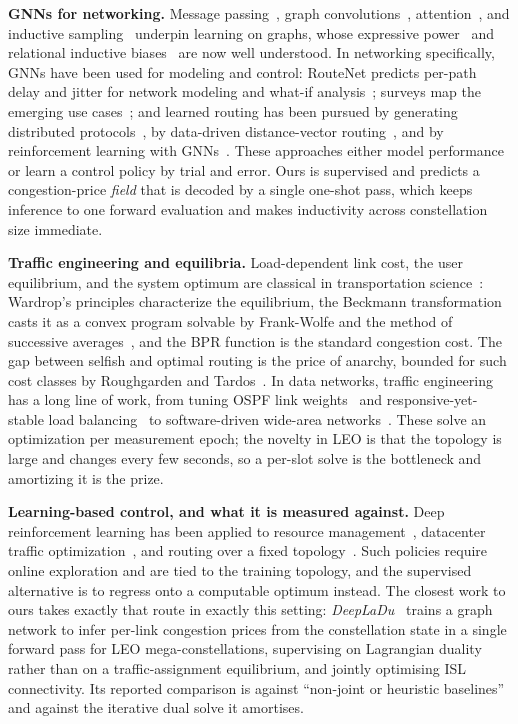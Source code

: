 \documentclass[journal]{IEEEtran}
\begin{document}
\textbf{GNNs for networking.} Message passing~\cite{mpnn}, graph convolutions~\cite{gcn},
attention~\cite{gat}, and inductive sampling~\cite{graphsage} underpin learning on graphs,
whose expressive power~\cite{gin} and relational inductive biases~\cite{battaglia} are now
well understood. In networking specifically, GNNs have been used for modeling and control:
RouteNet predicts per-path delay and jitter for network modeling and what-if
analysis~\cite{routenet}; surveys map the emerging use cases~\cite{suarez}; and learned
routing has been pursued by generating distributed protocols~\cite{geyer}, by data-driven
distance-vector routing~\cite{gddr}, and by reinforcement learning with
GNNs~\cite{almasan}. These approaches either model performance or learn a control policy by
trial and error. Ours is supervised and predicts a congestion-price \emph{field} that is
decoded by a single one-shot pass, which keeps inference to one forward evaluation and
makes inductivity across constellation size immediate.

\textbf{Traffic engineering and equilibria.} Load-dependent link cost, the user
equilibrium, and the system optimum are classical in transportation
science~\cite{wardrop,bpr,beckmann,sheffi}: Wardrop's principles characterize the
equilibrium, the Beckmann transformation casts it as a convex program solvable by
Frank-Wolfe and the method of successive averages~\cite{frankwolfe,sheffi}, and the BPR
function is the standard congestion cost. The gap between selfish and optimal routing is
the price of anarchy, bounded for such cost classes by Roughgarden and Tardos~\cite{poa}.
In data networks, traffic engineering has a long line of work, from tuning OSPF link
weights~\cite{fortz} and responsive-yet-stable load balancing~\cite{texcp} to
software-driven wide-area networks~\cite{swan,b4}. These solve an optimization per
measurement epoch; the novelty in LEO is that the topology is large and changes every few
seconds, so a per-slot solve is the bottleneck and amortizing it is the prize.

\textbf{Learning-based control, and what it is measured against.} Deep reinforcement learning
has been applied to resource management~\cite{deeprm}, datacenter traffic
optimization~\cite{auto}, and routing over a fixed topology~\cite{valadarsky,xu}. Such
policies require online exploration and are tied to the training topology, and the
supervised alternative is to regress onto a computable optimum instead. The closest work to
ours takes exactly that route in exactly this setting: \emph{DeepLaDu}~\cite{deepladu} trains
a graph network to infer per-link congestion prices from the constellation state in a single
forward pass for LEO mega-constellations, supervising on Lagrangian duality rather than on a
traffic-assignment equilibrium, and jointly optimising ISL connectivity. Its reported
comparison is against ``non-joint or heuristic baselines'' and against the iterative dual
solve it amortises.
\end{document}
